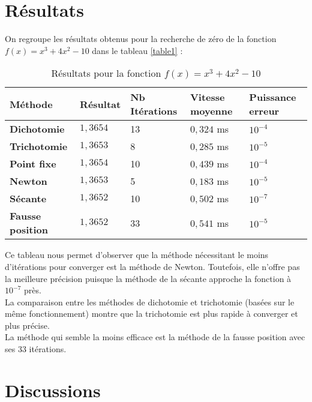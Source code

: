 \documentclass[12pt]{article}
\begin{document}
\section{Résultats}
\label{ref:resultats}
\noindent On regroupe les résultats obtenus pour la recherche de zéro de la fonction $f(x) = x^3 + 4x^2 -10$ dans le tableau \ref{table1} :
\begin{table}[H]
    \centering
    \begin{tabularx}{\linewidth}{|l|X|X|X|X|}
        \hline
        \textbf{Méthode} & \textbf{Résultat} & \textbf{Nb Itérations} & \textbf{Vitesse moyenne} & \textbf{Puissance erreur} \\
        \hline
        \textbf{Dichotomie} & $1,3654$ & 13 & $0,324$ ms & $10^{-4}$ \\
        \hline
        \textbf{Trichotomie} & $1,3653$ & 8 & $0,285$ ms & $10^{-5}$ \\
        \hline
        \textbf{Point fixe} & $1,3654$ & 10 & $0,439$ ms & $10^{-4}$ \\
        \hline
        \textbf{Newton} & $1,3653$ & 5 & $0,183$ ms & $10^{-5}$ \\
        \hline
        \textbf{Sécante} & $1,3652$ & 10 & $0,502$ ms & $10^{-7}$ \\
        \hline
        \textbf{Fausse position} & $1,3652$ & 33 & $0,541$ ms & $10^{-5}$ \\
        \hline
    \end{tabularx}
    \caption{Résultats pour la fonction $f(x) = x^3 + 4x^2 -10$}
    \label{table1}
    \label{tab:tableau}
\end{table}
\noindent Ce tableau nous permet d'observer que la méthode nécessitant le moins d'itérations pour converger est la méthode de Newton. Toutefois, elle n'offre pas la meilleure précision puisque la méthode de la sécante approche la fonction à $10^{-7}$ près.\\
La comparaison entre les méthodes de dichotomie et trichotomie (basées sur le même fonctionnement) montre que la trichotomie est plus rapide à converger et plus précise.\\
La méthode qui semble la moins efficace est la méthode de la fausse position avec ses 33 itérations.




\section{Discussions}
\label{ref:discussions}
\end{document}
